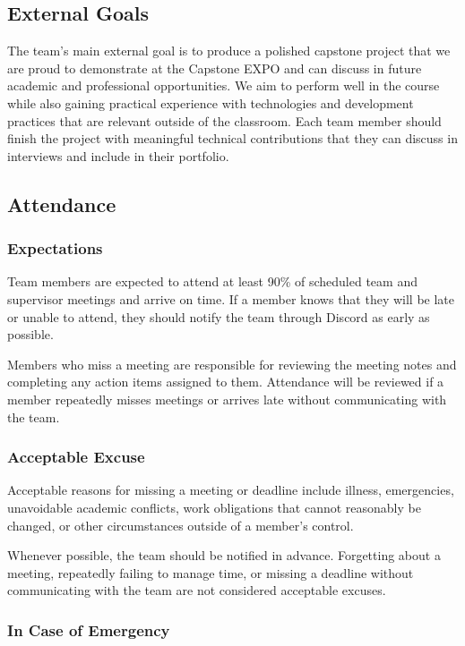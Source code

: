 \documentclass{article}
\begin{document}
\subsection*{External Goals}

The team’s main external goal is to produce a polished capstone project that we are proud to demonstrate at the Capstone EXPO and can discuss in future academic and professional opportunities. We aim to perform well in the course while also gaining practical experience with technologies and development practices that are relevant outside of the classroom. Each team member should finish the project with meaningful technical contributions that they can discuss in interviews and include in their portfolio.
\subsection*{Attendance}

\subsubsection*{Expectations}

Team members are expected to attend at least 90\% of scheduled team and supervisor meetings and arrive on time. If a member knows that they will be late or unable to attend, they should notify the team through Discord as early as possible.

Members who miss a meeting are responsible for reviewing the meeting notes and completing any action items assigned to them. Attendance will be reviewed if a member repeatedly misses meetings or arrives late without communicating with the team.

\subsubsection*{Acceptable Excuse}

Acceptable reasons for missing a meeting or deadline include illness, emergencies, unavoidable academic conflicts, work obligations that cannot reasonably be changed, or other circumstances outside of a member's control.

Whenever possible, the team should be notified in advance. Forgetting about a meeting, repeatedly failing to manage time, or missing a deadline without communicating with the team are not considered acceptable excuses.

\subsubsection*{In Case of Emergency}
\end{document}
